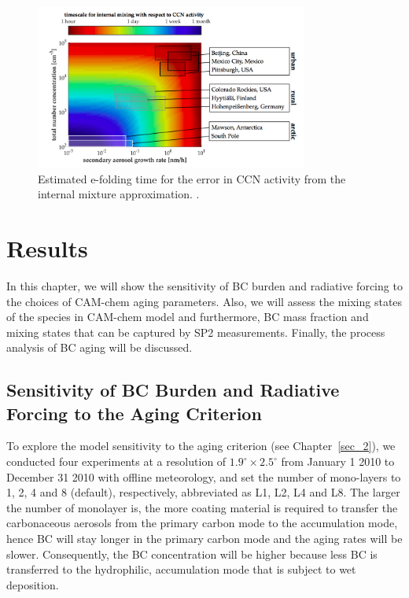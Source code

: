 \documentclass[12pt, fullpage]{uiucthesis2009}
\begin{document}
	\begin{figure}[h] 
		\begin{center}
			\includegraphics[width = 0.8\textwidth]{Figure07}
			\caption[Estimated e-folding time for the error in CCN activity from the internal mixture approximation. \citep{Fierce2016}]{\label{fig_P7}Estimated e-folding time for the error in CCN activity from the internal mixture approximation. \citep{Fierce2016}.}
		\end{center}
	\end{figure}
	
	\clearpage
	
	\chapter{Results}
	In this chapter, we will show the sensitivity of BC burden and radiative forcing to the choices of CAM-chem aging parameters. Also, we will assess the mixing states of the species in CAM-chem model and furthermore, BC mass fraction and mixing states that can be captured by SP2 measurements. Finally, the process analysis of BC aging will be discussed.
	
	\section{Sensitivity of BC Burden and Radiative Forcing to the Aging Criterion}{\label{sec_1}}
	To explore the model sensitivity to the aging criterion (see Chapter~\ref{sec_2}), we conducted four experiments at a resolution of $1.9^\circ \times 2.5^\circ$ from January 1 2010 to December 31 2010 with offline meteorology, and set the number of mono-layers to 1, 2, 4 and 8 (default), respectively, abbreviated as L1, L2, L4 and L8. The larger the number of monolayer is, the more coating material is required to transfer the carbonaceous aerosols from the primary carbon mode to the accumulation mode, hence BC will stay longer in the primary carbon mode and the aging rates will be slower. Consequently, the BC concentration will be higher because less BC is transferred to the hydrophilic, accumulation mode that is subject to wet deposition. 
\end{document}
